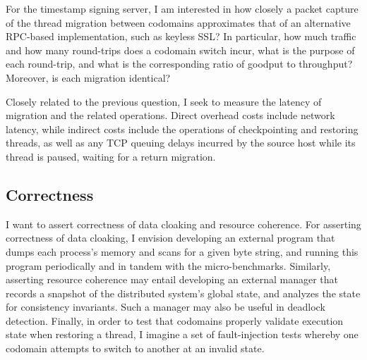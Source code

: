 For the timestamp signing server, I am interested in how closely a
packet capture of the thread migration between codomains approximates
that of an alternative RPC-based implementation, such as keyless SSL\@?
%
In particular, how much traffic and how many round-trips does a codomain switch
incur, what is the purpose of each round-trip, and what is the corresponding
ratio of goodput to throughput?
%
Moreover, is each migration identical?


Closely related to the previous question, I seek to measure the latency of
migration and the related operations.
%
Direct overhead costs include network latency, while indirect costs include the
operations of checkpointing and restoring threads, as well as any TCP queuing
delays incurred by the source host while its thread is paused, waiting for
a return migration.

\subsection{Correctness}

I want to assert correctness of data cloaking and resource coherence.
%
For asserting correctness of data cloaking, I envision developing an external
program that dumps each process's memory and scans for a given byte string,
and running this program periodically and in tandem with the micro-benchmarks.
%
Similarly, asserting resource coherence may entail developing an external
manager that records a snapshot of the distributed system's global state, and
analyzes the state for consistency invariants.
%
Such a manager may also be useful in deadlock detection.
%
Finally, in order to test that codomains properly validate execution state when
restoring a thread, I imagine a set of fault-injection tests whereby one
codomain attempts to switch to another at an invalid state.
